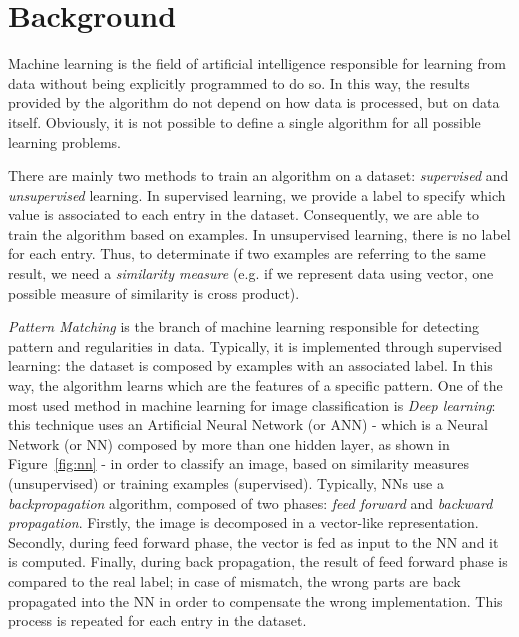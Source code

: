 \section{Background}
\label{sec:background}

Machine learning is the field of artificial intelligence responsible for 
learning from data without being explicitly programmed to do so. In this way, 
the results provided by the algorithm do not depend on how data is processed, 
but on data itself. Obviously, it is not possible to define a single algorithm 
for all possible learning problems.

There are mainly two methods to train an algorithm on a dataset: 
\textit{supervised} and \textit{unsupervised} learning. In supervised learning, 
we provide a label to specify which value is associated to each entry in the 
dataset. Consequently, we are able to train the algorithm based on examples. 
In unsupervised learning, there is no label for each entry. Thus, to determinate 
if two examples are referring to the same result, we need a 
\textit{similarity measure} (e.g. if we represent data using vector, one 
possible measure of similarity is cross product).

\textit{Pattern Matching} is the branch of machine learning responsible for 
detecting pattern and regularities in data. Typically, it is implemented through 
supervised learning: the dataset is composed by examples with an associated 
label. In this way, the algorithm learns which are the features of a specific 
pattern.
One of the most used method in machine learning for image classification is 
\textit{Deep learning}: this technique uses an Artificial Neural Network (or 
ANN) - which is a Neural Network (or NN) composed by more than one hidden layer, 
as shown in Figure~\ref{fig:nn} - in order to classify an image, based on 
similarity measures (unsupervised) or training examples (supervised). Typically, 
NNs use a \textit{backpropagation} algorithm, composed of two phases: 
\textit{feed forward} and \textit{backward propagation}. Firstly, the image is 
decomposed in a vector-like representation. Secondly, during feed forward phase, 
the vector is fed as input to the NN and it is computed. Finally, during back 
propagation, the result of feed forward phase is compared to the real label; in 
case of mismatch, the wrong parts are back propagated into the NN in order to 
compensate the wrong implementation. This process is repeated for each entry in the 
dataset.


